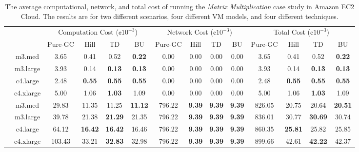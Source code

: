 \documentclass{llncs}
\begin{document}
\vspace{-0.5cm}
\begin{table*}[hbt]
	\scriptsize
	\centering
	\begin{tabular}{|c|c|c|c|c|c|c|c|c|c|c|c|c|c|}
	
	\cline{3-14}
	\multicolumn{2}{c|}{} & \multicolumn{4}{|c|}{Computation Cost ($\cent10^{-3}$)} & \multicolumn{4}{|c|}{Network Cost ($\cent10^{-3}$)}& \multicolumn{4}{|c|}{Total Cost ($\cent10^{-3}$)} \\
	\cline{3-14}
	\multicolumn{2}{c|}{} & Pure-GC & Hill & TD & BU & Pure-GC & Hill & TD & BU & Pure-GC & Hill & TD & BU \\
	\hline
	
	\parbox[t]{2mm}{} 
 & m3.med & 3.65 & 0.41 & 0.52 & \textbf{0.22} & 0.00 & 0.00 & 0.00 & 0.00 & 3.65 & 0.41 & 0.52 & \textbf{0.22} \\
 & m3.large & 3.93 & 0.14 & \textbf{0.13} & \textbf{0.13} & 0.00 & 0.00 & 0.00 & 0.00 & 3.93 & 0.14 & \textbf{0.13} & \textbf{0.13} \\
 & c4.large & 2.48 & \textbf{0.55} & \textbf{0.55} & \textbf{0.55} & 0.00 & 0.00 & 0.00 & 0.00 & 2.48 & \textbf{0.55} & \textbf{0.55} & \textbf{0.55} \\
 & c4.xlarge & 5.00 & 1.06 & \textbf{1.03} & 1.09 & 0.00 & 0.00 & 0.00 & 0.00 & 5.00 & 1.06 & \textbf{1.03} & 1.09 \\		
	\hline		
	\parbox[t]{2mm}{} 
 & m3.med & 29.83 & 11.35 & 11.25 & \textbf{11.12} & 796.22 & \textbf{9.39} & \textbf{9.39} & \textbf{9.39} & 826.05 & 20.75 & 20.64 & \textbf{20.51} \\
 & m3.large & 39.78 & 21.38 & \textbf{21.29} & 21.35 & 796.22 & \textbf{9.39} & \textbf{9.39} & \textbf{9.39} & 836.01 & 30.77 & \textbf{30.69} & 30.74 \\
 & c4.large & 64.12 & \textbf{16.42} & \textbf{16.42} & 16.46 & 796.22 & \textbf{9.39} & \textbf{9.39} & \textbf{9.39} & 860.35 & \textbf{25.81} & 25.82 & 25.85 \\ 
 & c4.xlarge & 103.43 & 33.21 & \textbf{32.83} & 32.98 & 796.22 & \textbf{9.39} & \textbf{9.39} & \textbf{9.39} & 899.66 & 42.61 & \textbf{42.22} & 42.37	\\	
	\hline
	\end{tabular}

	\caption{The average computational, network, and total cost of running the \emph{Matrix Multiplication} case study in Amazon EC2 Cloud. The results are for two different scenarios, four different VM models, and four different techniques.}
	\label{table:case:matrix:cost}
\end{table*}
\end{document}
